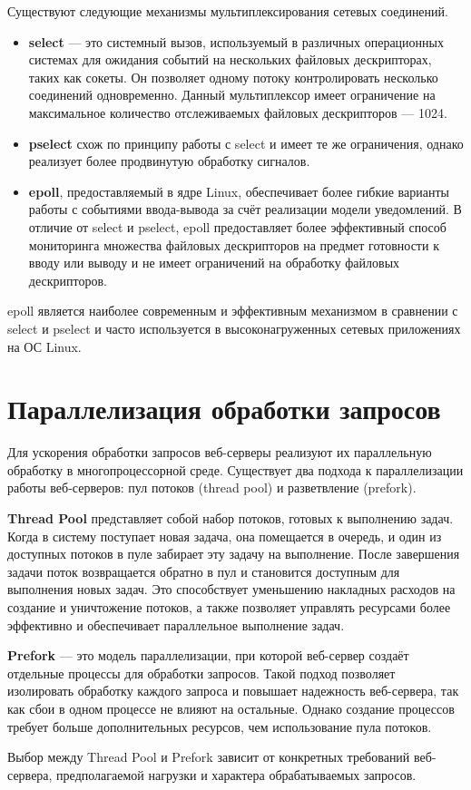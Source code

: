 Существуют следующие механизмы мультиплексирования сетевых соединений.

\begin{itemize}[label*=---]
	\item \textbf{select} --- это системный вызов, используемый в различных операционных системах для ожидания событий на нескольких файловых дескрипторах, таких как сокеты. Он позволяет одному потоку контролировать несколько соединений одновременно. Данный мультиплексор имеет ограничение на максимальное количество отслеживаемых файловых дескрипторов --- 1024.
	\item \textbf{pselect} схож по принципу работы с select и имеет те же ограничения, однако реализует более продвинутую обработку сигналов.
	\item \textbf{epoll}, предоставляемый в ядре Linux, обеспечивает более гибкие варианты работы с событиями ввода-вывода за счёт реализации модели уведомлений. В отличие от select и pselect, epoll предоставляет более эффективный способ мониторинга множества файловых дескрипторов на предмет готовности к вводу или выводу и не имеет ограничений на обработку файловых дескрипторов.
\end{itemize}

epoll является наиболее современным и эффективным механизмом в сравнении с select и pselect и часто используется в высоконагруженных сетевых приложениях на ОС Linux.



\section{Параллелизация обработки запросов}

Для ускорения обработки запросов веб-серверы реализуют их параллельную обработку в многопроцессорной среде. Существует два подхода к параллелизации работы веб-серверов: пул потоков (thread pool) и разветвление (prefork).

\textbf{Thread Pool} представляет собой набор потоков, готовых к выполнению задач. Когда в систему поступает новая задача, она помещается в очередь, и один из доступных потоков в пуле забирает эту задачу на выполнение. После завершения задачи поток возвращается обратно в пул и становится доступным для выполнения новых задач. Это способствует уменьшению накладных расходов на создание и уничтожение потоков, а также позволяет управлять ресурсами более эффективно и обеспечивает параллельное выполнение задач.

\textbf{Prefork} --- это модель параллелизации, при которой веб-сервер создаёт отдельные процессы для обработки запросов. Такой подход позволяет изолировать обработку каждого запроса и повышает надежность веб-сервера, так как сбои в одном процессе не влияют на остальные. Однако создание процессов требует больше дополнительных ресурсов, чем использование пула потоков.

Выбор между Thread Pool и Prefork зависит от конкретных требований веб-сервера, предполагаемой нагрузки и характера обрабатываемых запросов.
